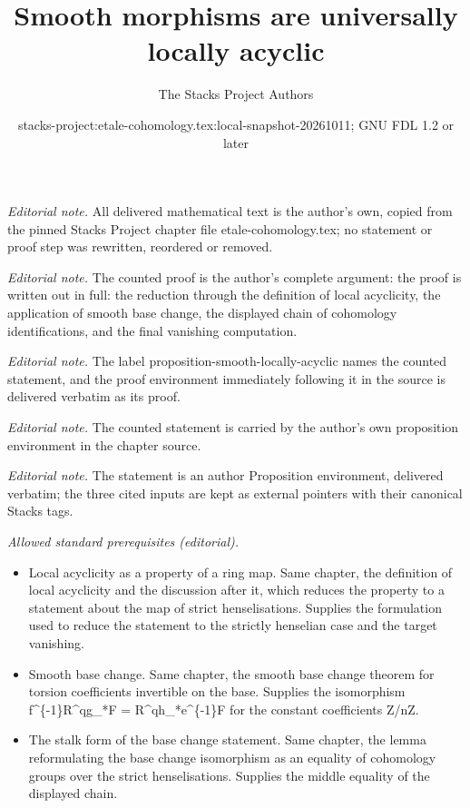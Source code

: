 \documentclass[10pt,a4paper]{amsart}
\title{Smooth morphisms are universally locally acyclic}
\author{The Stacks Project Authors}
\date{stacks-project:etale-cohomology.tex:local-snapshot-20261011; GNU FDL 1.2 or later}
\theoremstyle{plain}
\theoremstyle{definition}
\theoremstyle{remark}
\numberwithin{equation}{subsection}
\begin{document}
\maketitle
\noindent\textit{Editorial note.} All delivered mathematical text is the author's own, copied from the pinned Stacks Project chapter file etale-cohomology.tex; no statement or proof step was rewritten, reordered or removed.\par\medskip
\noindent\textit{Editorial note.} The counted proof is the author's complete argument: the proof is written out in full: the reduction through the definition of local acyclicity, the application of smooth base change, the displayed chain of cohomology identifications, and the final vanishing computation.\par\medskip
\noindent\textit{Editorial note.} The label proposition-smooth-locally-acyclic names the counted statement, and the proof environment immediately following it in the source is delivered verbatim as its proof.\par\medskip
\noindent\textit{Editorial note.} The counted statement is carried by the author's own proposition environment in the chapter source.\par\medskip
\noindent\textit{Editorial note.} The statement is an author Proposition environment, delivered verbatim; the three cited inputs are kept as external pointers with their canonical Stacks tags.\par\medskip
\noindent\textit{Allowed standard prerequisites (editorial).}\begin{itemize}
\item Local acyclicity as a property of a ring map. Same chapter, the definition of local acyclicity and the discussion after it, which reduces the property to a statement about the map of strict henselisations. Supplies the formulation used to reduce the statement to the strictly henselian case and the target vanishing.
\item Smooth base change. Same chapter, the smooth base change theorem for torsion coefficients invertible on the base. Supplies the isomorphism f\textasciicircum{}\{-1\}R\textasciicircum{}qg\_*F = R\textasciicircum{}qh\_*e\textasciicircum{}\{-1\}F for the constant coefficients Z/nZ.
\item The stalk form of the base change statement. Same chapter, the lemma reformulating the base change isomorphism as an equality of cohomology groups over the strict henselisations. Supplies the middle equality of the displayed chain.
\end{itemize}\medskip
\end{document}
